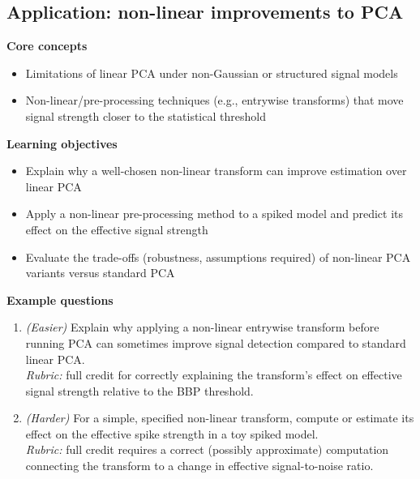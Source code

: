 \documentclass[11pt]{article}
\begin{document}
\subsection{Application: non-linear improvements to PCA}
\textbf{Core concepts}
\begin{itemize}[nosep]
\item Limitations of linear PCA under non-Gaussian or structured signal models
\item Non-linear/pre-processing techniques (e.g., entrywise transforms) that move signal strength closer to the statistical threshold
\end{itemize}
\textbf{Learning objectives}
\begin{itemize}[nosep]
\item Explain why a well-chosen non-linear transform can improve estimation over linear PCA
\item Apply a non-linear pre-processing method to a spiked model and predict its effect on the effective signal strength
\item Evaluate the trade-offs (robustness, assumptions required) of non-linear PCA variants versus standard PCA
\end{itemize}
\textbf{Example questions}
\begin{enumerate}[nosep]
\item \emph{(Easier)} Explain why applying a non-linear entrywise transform before running PCA can sometimes improve signal detection compared to standard linear PCA. \\
\emph{Rubric:} full credit for correctly explaining the transform's effect on effective signal strength relative to the BBP threshold.
\item \emph{(Harder)} For a simple, specified non-linear transform, compute or estimate its effect on the effective spike strength in a toy spiked model. \\
\emph{Rubric:} full credit requires a correct (possibly approximate) computation connecting the transform to a change in effective signal-to-noise ratio.
\end{enumerate}
\end{document}

